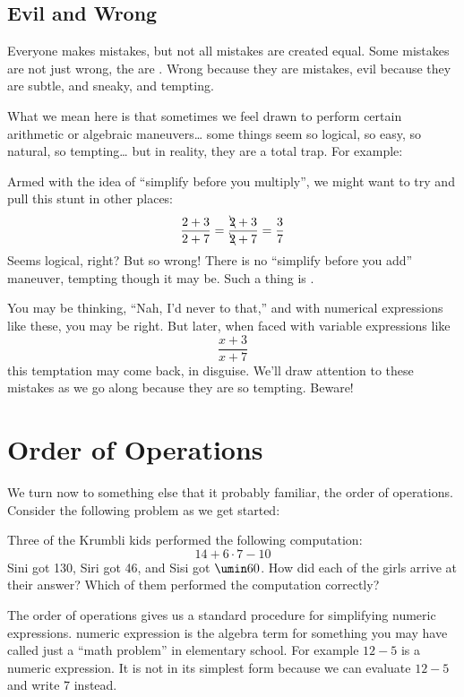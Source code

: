 \subsection{Evil and Wrong}

Everyone makes mistakes, but not all mistakes are created equal. Some mistakes are not just wrong, the are \evilandwrong. Wrong because they are mistakes, evil because they are subtle, and sneaky, and tempting.

What we mean here is that sometimes we feel drawn to perform certain arithmetic or algebraic maneuvers\ldots{} some things seem so logical, so easy, so natural, so tempting\ldots{} but in reality, they are a total trap. For example:

\begin{boxedwarning}
Armed with the idea of ``simplify before you multiply'', we might want to try and pull this stunt in other places: \[\frac{2+3}{2+7} = \frac{\bcancel{2}+3}{\bcancel{2}+7} = \frac{3}{7}\]Seems logical, right? But so wrong! There is no ``simplify before you add'' maneuver, tempting though it may be. Such a thing is \evilandwrong.
\end{boxedwarning}

You may be thinking, ``Nah, I'd never to that,'' and with numerical expressions like these, you may be right. But later, when faced with variable expressions like \[\frac{x+3}{x+7}\]
this temptation may come back, in disguise. We'll draw attention to these \evilandwrong{} mistakes as we go along because they are so tempting. Beware!


\section{Order of Operations}
\label{sec:orderofops}

We turn now to something else that it probably familiar, the \gls{order of operations}. Consider the following problem as we get started:

\begin{boxedexplore}
Three of the Krumbli kids performed the following computation: \[14 + 6 \cdot 7 - 10\] Sini got 130, Siri got 46, and Sisi got $\umin60$. How did each of the girls arrive at their answer? Which of them performed the computation correctly?
\end{boxedexplore}

The order of operations gives us a standard procedure for simplifying numeric expressions. \Gls{numeric expression} is the algebra term for something you may have called just a ``math problem'' in elementary school. For example $12 - 5$ is a numeric expression. It is not in its simplest form because we can evaluate $12 - 5$ and write 7 instead.  

